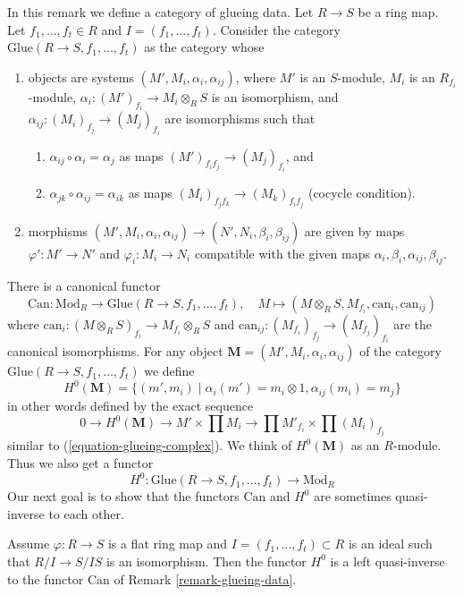 \begin{remark}
\label{remark-glueing-data}
In this remark we define a category of glueing data.
Let $R \to S$ be a ring map.
Let $f_1, \ldots, f_t \in R$ and $I = (f_1, \ldots, f_t)$.
Consider the category $\text{Glue}(R \to S, f_1, \ldots, f_t)$
as the category whose
\begin{enumerate}
\item objects are systems $(M', M_i, \alpha_i, \alpha_{ij})$, where
$M'$ is an $S$-module, $M_i$ is an $R_{f_i}$-module,
$\alpha_i : (M')_{f_i} \to M_i \otimes_R S$ is an isomorphism, and
$\alpha_{ij} : (M_i)_{f_j} \to (M_j)_{f_i}$ are isomorphisms
such that
\begin{enumerate}
\item $\alpha_{ij} \circ \alpha_i = \alpha_j$ as maps
$(M')_{f_if_j} \to (M_j)_{f_i}$, and
\item $\alpha_{jk} \circ \alpha_{ij} = \alpha_{ik}$ as maps
$(M_i)_{f_jf_k} \to (M_k)_{f_if_j}$ (cocycle condition).
\end{enumerate}
\item morphisms
$(M', M_i, \alpha_i, \alpha_{ij}) \to (N', N_i, \beta_i, \beta_{ij})$
are given by maps $\varphi' : M' \to N'$ and $\varphi_i : M_i \to N_i$
compatible with the given maps $\alpha_i, \beta_i, \alpha_{ij}, \beta_{ij}$.
\end{enumerate}
There is a canonical functor
$$
\text{Can} : \text{Mod}_R
\longrightarrow
\text{Glue}(R \to S, f_1, \ldots, f_t),
\quad
M \longmapsto (M \otimes_R S, M_{f_i}, \text{can}_i, \text{can}_{ij})
$$
where $\text{can}_i : (M \otimes_R S)_{f_i} \to M_{f_i} \otimes_R S$
and $\text{can}_{ij} : (M_{f_i})_{f_j} \to (M_{f_j})_{f_i}$
are the canonical isomorphisms. For any object
$\mathbf{M} = (M', M_i, \alpha_i, \alpha_{ij})$ of the category
$\text{Glue}(R \to S, f_1, \ldots, f_t)$ we define
$$
H^0(\mathbf{M}) =
\{(m', m_i) \mid \alpha_i(m') = m_i \otimes 1, \alpha_{ij}(m_i) = m_j\}
$$
in other words defined by the exact sequence
$$
0 \to H^0(\mathbf{M}) \to
M' \times \prod M_i \to
\prod M'_{f_i}
\times
\prod (M_i)_{f_j}
$$
similar to (\ref{equation-glueing-complex}).
We think of $H^0(\mathbf{M})$ as an $R$-module. Thus we also get a functor
$$
H^0 :
\text{Glue}(R \to S, f_1, \ldots, f_t)
\longrightarrow
\text{Mod}_R
$$
Our next goal is to show that the functors
$\text{Can}$ and $H^0$ are sometimes quasi-inverse to each other.
\end{remark}

\begin{lemma}
\label{lemma-H0-inverse}
Assume $\varphi : R \to S$ is a flat ring map and
$I = (f_1, \ldots, f_t) \subset R$ is an ideal such that
$R/I \to S/IS$ is an isomorphism. Then the functor $H^0$
is a left quasi-inverse to the functor $\text{Can}$ of
Remark \ref{remark-glueing-data}.
\end{lemma}


